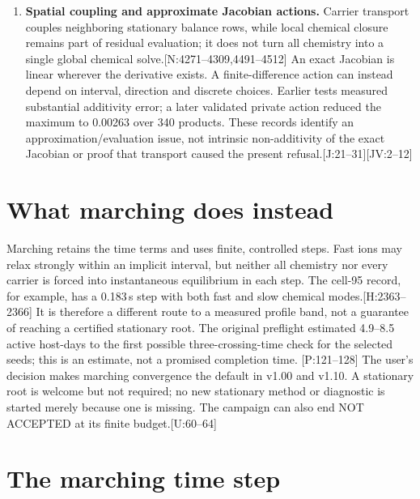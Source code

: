\documentclass[english,a4paper]{my_memo}
\newcommand{\ev}[2]{\textnormal{\small[#1:#2]}}
\begin{document}
\begin{enumerate}
\item \textbf{Spatial coupling and approximate Jacobian actions.} Carrier
transport couples neighboring stationary balance rows, while local chemical
closure remains part of residual evaluation; it does not turn all chemistry
into a single global chemical solve.\ev{N}{4271--4309,4491--4512}
An exact Jacobian is linear wherever the derivative exists. A finite-difference
action can instead depend on interval, direction and discrete choices.
Earlier tests measured substantial additivity error; a later validated
private action reduced the maximum to 0.00263 over 340 products. These
records identify an approximation/evaluation issue, not intrinsic
non-additivity of the exact Jacobian or proof that transport caused the
present refusal.\ev{J}{21--31}\ev{JV}{2--12}
\end{enumerate}

\section{What marching does instead}

Marching retains the time terms and uses finite, controlled steps. Fast ions
may relax strongly within an implicit interval, but neither all chemistry
nor every carrier is forced into instantaneous equilibrium in each step.
The cell-95 record, for example, has a 0.183\,s step with both fast and slow
chemical modes.\ev{H}{2363--2366}
It is therefore a different route to a measured profile band, not a guarantee
of reaching a certified stationary root. The original preflight estimated
4.9--8.5 active host-days to the first possible three-crossing-time check for
the selected seeds; this is an estimate, not a promised completion time.
\ev{P}{121--128}
The user's decision makes marching convergence the default in v1.00 and
v1.10. A stationary root is welcome but not required; no new stationary
method or diagnostic is started merely because one is missing. The campaign
can also end NOT ACCEPTED at its finite budget.\ev{U}{60--64}

\section{The marching time step}
\end{document}
